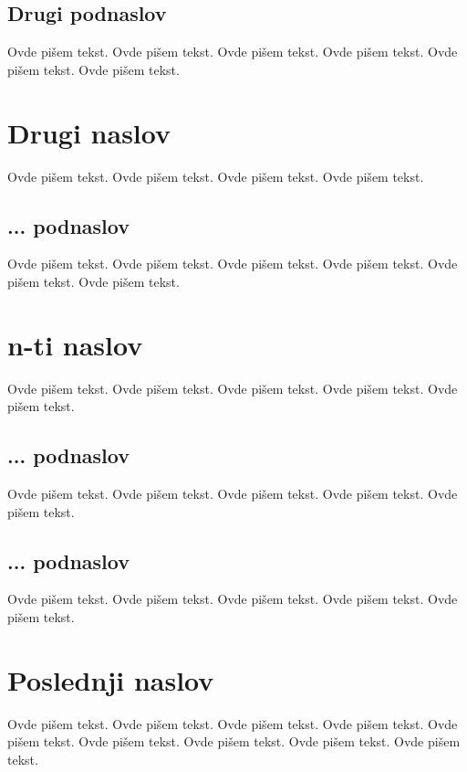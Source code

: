 \documentclass[a4paper]{article}
\begin{document}
\subsection{Drugi podnaslov}
\label{subsec:podnaslov2}

Ovde pišem tekst. 
Ovde pišem tekst. 
Ovde pišem tekst. 
Ovde pišem tekst. 
Ovde pišem tekst. 
Ovde pišem tekst. 

\section{Drugi naslov}
\label{sec:naslov2}

Ovde pišem tekst. 
Ovde pišem tekst. 
Ovde pišem tekst. 
Ovde pišem tekst. 

\subsection{... podnaslov}
\label{subsec:podnaslovN}

Ovde pišem tekst. 
Ovde pišem tekst. 
Ovde pišem tekst. 
Ovde pišem tekst. 
Ovde pišem tekst. 
Ovde pišem tekst. 

\section{n-ti naslov}
\label{sec:naslovN}

Ovde pišem tekst. 
Ovde pišem tekst. 
Ovde pišem tekst. 
Ovde pišem tekst. 
Ovde pišem tekst. 

\subsection{... podnaslov}
\label{subsec:podnaslovK}

Ovde pišem tekst. 
Ovde pišem tekst. 
Ovde pišem tekst. 
Ovde pišem tekst. 
Ovde pišem tekst. 

\subsection{... podnaslov}
\label{subsec:podnaslovM}

Ovde pišem tekst. 
Ovde pišem tekst. 
Ovde pišem tekst. 
Ovde pišem tekst. 
Ovde pišem tekst. 

\section{Poslednji naslov}
\label{sec:naslovM}

Ovde pišem tekst. 
Ovde pišem tekst. 
Ovde pišem tekst. 
Ovde pišem tekst. 
Ovde pišem tekst. 
Ovde pišem tekst. 
Ovde pišem tekst. 
Ovde pišem tekst. 
Ovde pišem tekst. 
\end{document}
